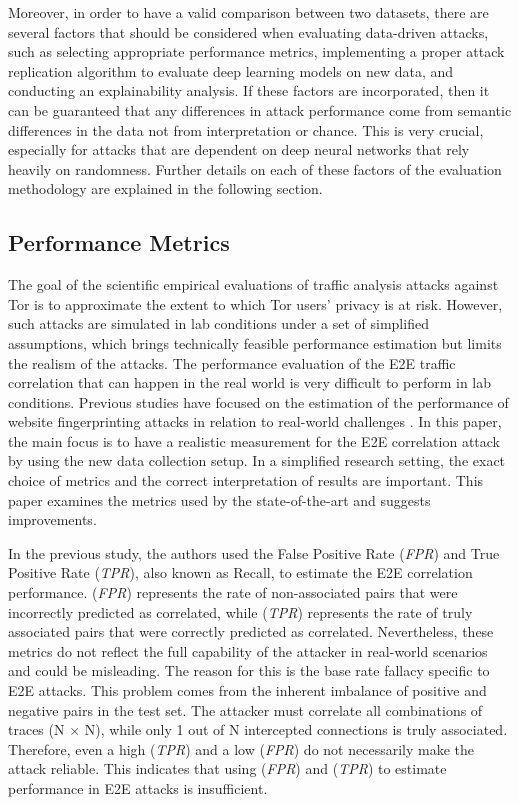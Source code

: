 \documentclass[sigconf]{acmart}
\begin{document}
Moreover, in order to have a valid comparison between two datasets, there are several factors that should be considered when evaluating data-driven attacks, such as selecting appropriate performance metrics, implementing a proper attack replication algorithm to evaluate deep learning models on new data, and conducting an explainability analysis. If these factors are incorporated, then it can be guaranteed that any differences in attack performance come from semantic differences in the data not from interpretation or chance. This is very crucial, especially for attacks that are dependent on deep neural networks that rely heavily on randomness. Further details on each of these factors of the evaluation methodology are explained in the following section.


\subsection{Performance Metrics} \label{6.1}

The goal of the scientific empirical evaluations of traffic analysis attacks against Tor is to approximate the extent to which Tor users' privacy is at risk. However, such attacks are simulated in lab conditions under a set of simplified assumptions, which brings technically feasible performance estimation but limits the realism of the attacks. The performance evaluation of the E2E traffic correlation that can happen in the real world is very difficult to perform in lab conditions. Previous studies have focused on the estimation of the performance of website fingerprinting attacks in relation to real-world challenges \cite{juarez2014critical,wang2020high}. In this paper, the main focus is to have a realistic measurement for the E2E correlation attack by using the new data collection setup. In a simplified research setting, the exact choice of metrics and the correct interpretation of results are important. This paper examines the metrics used by the state-of-the-art and suggests improvements.

In the previous study, the authors used the False Positive Rate (\textit{FPR}) and True Positive Rate (\textit{TPR}), also known as Recall, to estimate the E2E correlation performance. (\textit{FPR}) represents the rate of non-associated pairs that were incorrectly predicted as correlated, while (\textit{TPR}) represents the rate of truly associated pairs that were correctly predicted as correlated. Nevertheless, these metrics do not reflect the full capability of the attacker in real-world scenarios and could be misleading. The reason for this is the base rate fallacy specific to E2E attacks. This problem comes from the inherent imbalance of positive and negative pairs in the test set. The attacker must correlate all combinations of traces (N × N), while only 1 out of N intercepted connections is truly associated. Therefore, even a high (\textit{TPR}) and a low (\textit{FPR}) do not necessarily make the attack reliable. This indicates that using (\textit{FPR}) and (\textit{TPR}) to estimate performance in E2E attacks is insufficient.
\end{document}
